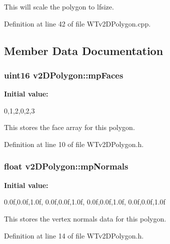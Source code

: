 This will scale the polygon to lfsize. 



Definition at line 42 of file WTv2DPolygon.cpp.



\subsection{Member Data Documentation}
\hypertarget{classv2_d_polygon_ae352b67e87126247d82c34a27aa5fd7c}{
\subsubsection[{mpFaces}]{\setlength{\rightskip}{0pt plus 5cm}uint16 {\bf v2DPolygon::mpFaces}}}
\label{classv2_d_polygon_ae352b67e87126247d82c34a27aa5fd7c}
{\bfseries Initial value:}
\begin{DoxyCode}

{
 0,1,2,0,2,3
}
\end{DoxyCode}


This stores the face array for this polygon. 



Definition at line 10 of file WTv2DPolygon.h.

\hypertarget{classv2_d_polygon_a79c7a17e7b0b50165282f68d644dad2e}{
\subsubsection[{mpNormals}]{\setlength{\rightskip}{0pt plus 5cm}float {\bf v2DPolygon::mpNormals}}}
\label{classv2_d_polygon_a79c7a17e7b0b50165282f68d644dad2e}
{\bfseries Initial value:}
\begin{DoxyCode}

{
 0.0f,0.0f,1.0f,
 0.0f,0.0f,1.0f,
 0.0f,0.0f,1.0f,
 0.0f,0.0f,1.0f
}
\end{DoxyCode}


This stores the vertex normals data for this polygon. 



Definition at line 14 of file WTv2DPolygon.h.

